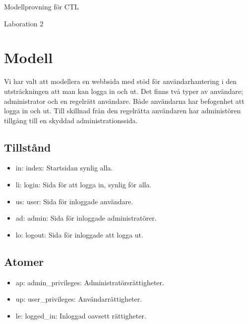 \documentclass{article}
\begin{document}
\centerline{\sc \large Modellprovning för CTL}
\vspace{.5pc}
\centerline{\sc Laboration 2}
\vspace{2pc}

\section{Modell}
Vi har valt att modellera en webbsida med stöd för användarhantering i den
utsträckningen att man kan logga in och ut. Det finns två typer av användare;
administrator och en regelrätt användare. Både användarna har befogenhet att
logga in och ut. Till skillnad från den regelrätta användaren har administören
tillgång till en skyddad administrationssida.

\subsection{Tillstånd}

\begin{itemize}

\item in: index: Startsidan synlig alla.
\item li: login: Sida för att logga in, synlig för alla.
\item us: user: Sida för inloggade användare.
\item ad: admin: Sida för inloggade administratörer. 
\item lo: logout: Sida för inloggade att logga ut. 

\end{itemize}

\subsection{Atomer}

\begin{itemize}

\item ap: admin\_privileges: Administratörsrättigheter.
\item up: user\_privileges: Användarrättigheter.
\item le: logged\_in: Inloggad oavsett rättigheter.

\end{itemize}
\end{document}
